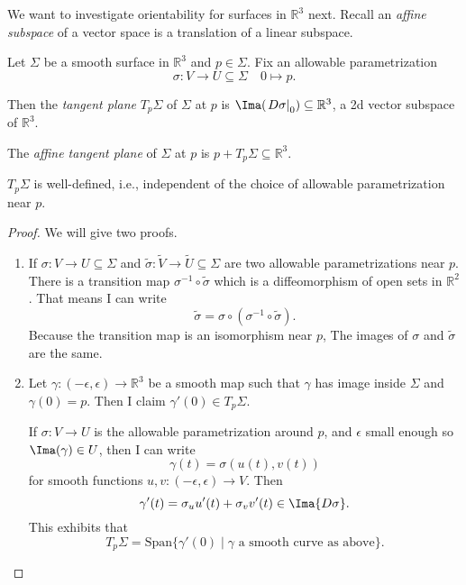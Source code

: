 We want to investigate orientability for surfaces in \(\mathbb{R}^3\) next. Recall an \textit{affine subspace} of a vector space is a translation of a linear subspace.
\begin{definition}
    Let \(\Sigma\) be a smooth surface in \(\mathbb{R}^3\) and \(p \in \Sigma\). Fix an allowable parametrization
    \[
        \sigma: V \to U \subseteq \Sigma \quad 0 \mapsto p.
    \]

    Then the \textit{tangent plane} \(T_p\Sigma\) of \(\Sigma\) at \(p\) is \(\Ima(\left.D\sigma\right|_0) \subseteq \mathbb{R}^3\), a 2d vector subspace of \(\mathbb{R}^3\).

    The \textit{affine tangent plane} of \(\Sigma\) at \(p\) is \(p + T_p\Sigma \subseteq \mathbb{R}^3\).
\end{definition}
\begin{lemma}
    \(T_p\Sigma\) is well-defined, i.e., independent of the choice of allowable parametrization near \(p\).
\end{lemma}
\begin{proof}
    We will give two proofs.
    \begin{enumerate}
        \item If \(\sigma: V \to U \subseteq \Sigma\) and \(\tilde{\sigma}: \tilde{V} \to \tilde{U} \subseteq \Sigma\) are two allowable parametrizations near \(p\). There is a transition map \(\sigma^{-1}\circ \tilde{\sigma}\) which is a diffeomorphism of open sets in \(\mathbb{R}^2\). That means I can write
        \[
            \tilde{\sigma} = \sigma\circ (\sigma^{-1}\circ \tilde{\sigma}).
        \]
        Because the transition map is an isomorphism near \(p\), The images of \(\sigma\) and \(\tilde{\sigma}\) are the same.
        \item Let \(\gamma: (-\epsilon, \epsilon) \to \mathbb{R}^3\) be a smooth map such that \(\gamma\) has image inside \(\Sigma\) and \(\gamma(0) = p\). Then I claim \(\gamma'(0) \in T_p\Sigma\).

        If \(\sigma: V \to U\) is the allowable parametrization around \(p\), and \(\epsilon\) small enough so \(\Ima(\gamma)\in U\), then I can write
        \[
            \gamma(t) = \sigma(u(t), v(t))
        \]
        for smooth functions \(u, v: (-\epsilon, \epsilon)\to V\). Then
        \[\gamma'(t)= \sigma_u u'(t) + \sigma_v v'(t) \in \Ima{D\sigma}.\]
        This exhibits that
        \[
            T_{p}\Sigma = \mathrm{Span}\{\gamma'(0)\mid \gamma \text{ a smooth curve as above}\}.
        \]
    \end{enumerate}
\end{proof}
